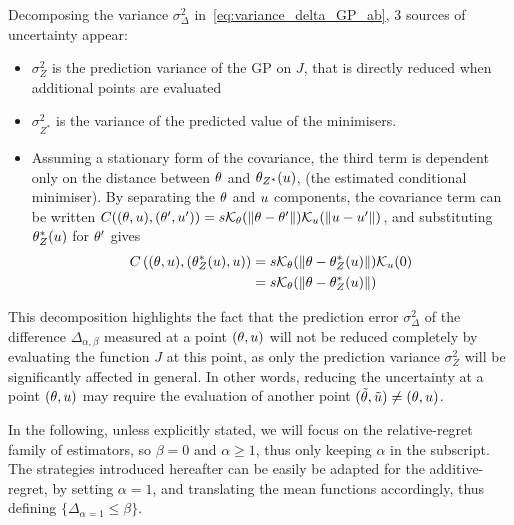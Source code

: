 \documentclass[../../Main_ManuscritThese.tex]{subfiles}
\begin{document}
Decomposing the variance $\sigma^2_{\Delta}$
in~\cref{eq:variance_delta_GP_ab}, 3 sources of uncertainty appear:
\begin{itemize}
\item $\sigma^2_{Z}$ is the prediction variance of the GP on $J$, that
  is directly reduced when additional points are evaluated
\item $\sigma^2_{Z^*}$ is the variance of the predicted value of the
  minimisers.
\item Assuming a stationary form of the covariance, the third term is
  dependent only on the distance between $\theta$ and $\theta_{Z^*}(u)$,
  (the estimated conditional minimiser). By separating the $\theta$ and
  $u$ components, the covariance term can be written
  $C((\theta,u), (\theta^{\prime},u^{\prime})) = s
  \mathcal{K}_{\theta}(\|\theta - \theta^{\prime}\|) \mathcal{K}_{u}(\|u -
  u^{\prime}\|)$, and
  substituting $\theta^*_Z(u)$ for $\theta^{\prime}$ gives
  \begin{align}
    C\left((\theta,u),(\theta^*_Z(u),u)\right) &= s  \mathcal{K}_{\theta}(\|\theta - \theta^*_Z(u)\|) \mathcal{K}_{u}(0) \\
                                                &= s  \mathcal{K}_{\theta}(\|\theta - \theta^*_Z(u)\|)
  \end{align}
\end{itemize}
This decomposition highlights the fact that the prediction error
$\sigma_{\Delta}^2$ of the difference $\Delta_{\alpha,\beta}$ measured
at a point $(\theta, u)$ will not be reduced completely by evaluating
the function $J$ at this point, as only the prediction variance
$\sigma_Z^2$ will be significantly affected in general. In other
words, reducing the uncertainty at a point $(\theta, u)$ may require
the evaluation of another point
$(\tilde{\theta},\tilde{u}) \neq (\theta, u)$.

In the following, unless explicitly stated, we will focus on the
relative-regret family of estimators, so $\beta=0$ and
$\alpha \geq 1$, thus only keeping $\alpha$ in the subscript.  The
strategies introduced hereafter can be easily be adapted for the
additive-regret, by setting $\alpha=1$, and translating the mean
functions accordingly, thus defining
$\{\Delta_{\alpha=1} \leq \beta \}$.


\end{document}
